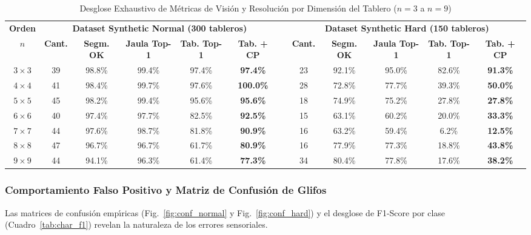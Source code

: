 \documentclass[conference]{IEEEtran}
\begin{document}
\begin{table}[t]
\caption{Desglose Exhaustivo de M\'etricas de Visi\'on y Resoluci\'on por Dimensi\'on del Tablero \texorpdfstring{($n=3$ a $n=9$)}{(n=3 a n=9)}}
\label{tab:dim_breakdown}
\centering
\footnotesize
\setlength{\tabcolsep}{2.5pt}
\begin{tabular}{@{}cccccccccccc@{}}
\toprule
\textbf{Orden} & \multicolumn{5}{c}{\textbf{Dataset Synthetic Normal (300 tableros)}} & & \multicolumn{5}{c}{\textbf{Dataset Synthetic Hard (150 tableros)}} \\
\cmidrule(lr){2-6} \cmidrule(lr){8-12}
$n$ & \textbf{Cant.} & \textbf{Segm. OK} & \textbf{Jaula Top-1} & \textbf{Tab. Top-1} & \textbf{Tab. + CP} & & \textbf{Cant.} & \textbf{Segm. OK} & \textbf{Jaula Top-1} & \textbf{Tab. Top-1} & \textbf{Tab. + CP} \\
\midrule
$3 \times 3$ & 39 & 98.8\% & 99.4\% & 97.4\% & \textbf{97.4\%} & & 23 & 92.1\% & 95.0\% & 82.6\% & \textbf{91.3\%} \\
$4 \times 4$ & 41 & 98.4\% & 99.7\% & 97.6\% & \textbf{100.0\%} & & 28 & 72.8\% & 77.7\% & 39.3\% & \textbf{50.0\%} \\
$5 \times 5$ & 45 & 98.2\% & 99.4\% & 95.6\% & \textbf{95.6\%} & & 18 & 74.9\% & 75.2\% & 27.8\% & \textbf{27.8\%} \\
$6 \times 6$ & 40 & 97.4\% & 97.7\% & 82.5\% & \textbf{92.5\%} & & 15 & 63.1\% & 60.2\% & 20.0\% & \textbf{33.3\%} \\
$7 \times 7$ & 44 & 97.6\% & 98.7\% & 81.8\% & \textbf{90.9\%} & & 16 & 63.2\% & 59.4\% & 6.2\% & \textbf{12.5\%} \\
$8 \times 8$ & 47 & 96.7\% & 96.7\% & 61.7\% & \textbf{80.9\%} & & 16 & 77.9\% & 77.3\% & 18.8\% & \textbf{43.8\%} \\
$9 \times 9$ & 44 & 94.1\% & 96.3\% & 61.4\% & \textbf{77.3\%} & & 34 & 80.4\% & 77.8\% & 17.6\% & \textbf{38.2\%} \\
\bottomrule
\end{tabular}
\end{table}

\subsubsection{Comportamiento Falso Positivo y Matriz de Confusi\'on de Glifos}
Las matrices de confusi\'on emp\'{\i}ricas (Fig.~\ref{fig:conf_normal} y Fig.~\ref{fig:conf_hard}) y el desglose de F1-Score por clase (Cuadro~\ref{tab:char_f1}) revelan la naturaleza de los errores sensoriales.
\end{document}
